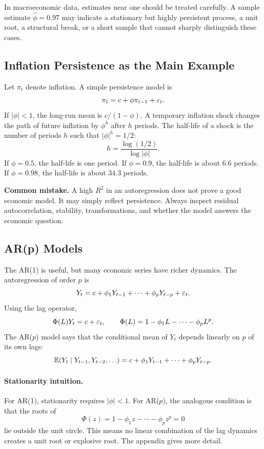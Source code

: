 In macroeconomic data, estimates near one should be treated carefully. A sample estimate $\hat{\phi}=0.97$ may indicate a stationary but highly persistent process, a unit root, a structural break, or a short sample that cannot sharply distinguish these cases.

\subsection{Inflation Persistence as the Main Example}
Let $\pi_t$ denote inflation. A simple persistence model is
\begin{equation}
\pi_t=c+\phi\pi_{t-1}+\varepsilon_t.
\label{eq:infl_ar1}
\end{equation}
If $|\phi|<1$, the long-run mean is $c/(1-\phi)$. A temporary inflation shock changes the path of future inflation by $\phi^h$ after $h$ periods. The half-life of a shock is the number of periods $h$ such that $|\phi|^h=1/2$:
\[
h=\frac{\log(1/2)}{\log|\phi|}.
\]
If $\phi=0.5$, the half-life is one period. If $\phi=0.9$, the half-life is about $6.6$ periods. If $\phi=0.98$, the half-life is about $34.3$ periods.

\begin{boxF}
\textbf{Common mistake.}
A high $R^2$ in an autoregression does not prove a good economic model. It may simply reflect persistence. Always inspect residual autocorrelation, stability, transformations, and whether the model answers the economic question.
\end{boxF}

\subsection{AR(p) Models}
The AR(1) is useful, but many economic series have richer dynamics. The autoregression of order $p$ is
\begin{equation}
Y_t=c+\phi_1Y_{t-1}+\cdots+\phi_pY_{t-p}+\varepsilon_t.
\label{eq:arp}
\end{equation}
Using the lag operator,
\[
\Phi(L)Y_t=c+\varepsilon_t,
\qquad
\Phi(L)=1-\phi_1L-\cdots-\phi_pL^p.
\]
The AR($p$) model says that the conditional mean of $Y_t$ depends linearly on $p$ of its own lags:
\[
\mathbb{E}(Y_t\mid Y_{t-1},Y_{t-2},\ldots)=c+\phi_1Y_{t-1}+\cdots+\phi_pY_{t-p}.
\]

\paragraph{Stationarity intuition.}
For AR(1), stationarity requires $|\phi|<1$. For AR($p$), the analogous condition is that the roots of
\[
\Phi(z)=1-\phi_1z-\cdots-\phi_pz^p=0
\]
lie outside the unit circle. This means no linear combination of the lag dynamics creates a unit root or explosive root. The appendix gives more detail.

